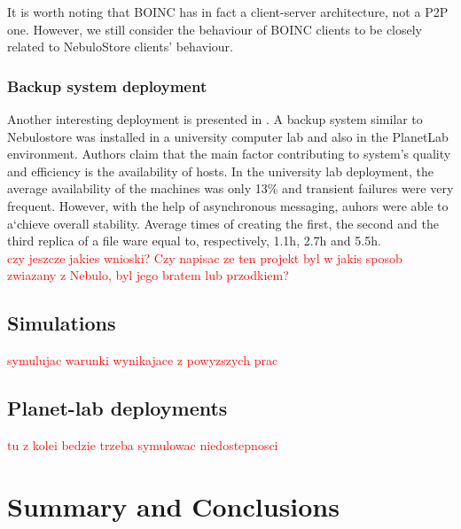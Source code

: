 \documentclass{pracamgren}
\begin{document}
It is worth noting that BOINC has in fact a client-server architecture, not a P2P one. However, we still consider the behaviour of BOINC clients to be closely related to NebuloStore clients' behaviour.\\

\subsection{Backup system deployment}

Another interesting deployment is presented in \cite{hetero}. A backup system similar to Nebulostore was installed in a university computer lab and also in the PlanetLab environment. Authors claim that the main factor contributing to system's quality and efficiency is the availability of hosts. In the university lab deployment, the average availability of the machines was only 13\% and transient failures were very frequent. However, with the help of asynchronous messaging, auhors were able to a`chieve overall stability. Average times of creating the first, the second and the third replica of a file ware equal to, respectively, 1.1h, 2.7h and 5.5h.\\

\textcolor{red}{czy jeszcze jakies wnioski? Czy napisac ze ten projekt byl w jakis sposob zwiazany z Nebulo, byl jego bratem lub przodkiem?}

\section{Simulations}

\textcolor{red}{symulujac warunki wynikajace z powyzszych prac}

\section{Planet-lab deployments}

\textcolor{red}{tu z kolei bedzie trzeba symulowac niedostepnosci}
 
 

\chapter{Summary and Conclusions}\label{chap:conclusions}


%
%
%
%




\end{document}
